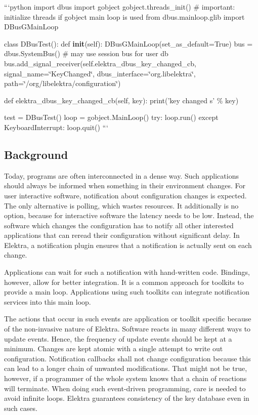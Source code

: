```python import dbus import gobject gobject.\+threads\+\_\+init() \# important\+: initialize threads if gobject main loop is used from dbus.\+mainloop.\+glib import D\+Bus\+G\+Main\+Loop

class D\+Bus\+Test()\+: def {\bfseries init}(self)\+: D\+Bus\+G\+Main\+Loop(set\+\_\+as\+\_\+default=True) bus = dbus.\+System\+Bus() \# may use session bus for user db bus.\+add\+\_\+signal\+\_\+receiver(self.\+elektra\+\_\+dbus\+\_\+key\+\_\+changed\+\_\+cb, signal\+\_\+name=\char`\"{}\+Key\+Changed\char`\"{}, dbus\+\_\+interface=\char`\"{}org.\+libelektra\char`\"{}, path=\char`\"{}/org/libelektra/configuration\char`\"{})

def elektra\+\_\+dbus\+\_\+key\+\_\+changed\+\_\+cb(self, key)\+: print('key changed s' \% key)

test = D\+Bus\+Test() loop = gobject.\+Main\+Loop() try\+: loop.\+run() except Keyboard\+Interrupt\+: loop.\+quit() ```

\subsection*{Background}

Today, programs are often interconnected in a dense way. Such applications should always be informed when something in their environment changes. For user interactive software, notification about configuration changes is expected. The only alternative is polling, which wastes resources. It additionally is no option, because for interactive software the latency needs to be low. Instead, the software which changes the configuration has to notify all other interested applications that can reread their configuration without significant delay. In Elektra, a notification plugin ensures that a notification is actually sent on each change.

Applications can wait for such a notification with hand-\/written code. Bindings, however, allow for better integration. It is a common approach for toolkits to provide a main loop. Applications using such toolkits can integrate notification services into this main loop.

The actions that occur in such events are application or toolkit specific because of the non-\/invasive nature of Elektra. Software reacts in many different ways to update events. Hence, the frequency of update events should be kept at a minimum. Changes are kept atomic with a single attempt to write out configuration. Notification callbacks shall not change configuration because this can lead to a longer chain of unwanted modifications. That might not be true, however, if a programmer of the whole system knows that a chain of reactions will terminate. When doing such event-\/driven programming, care is needed to avoid infinite loops. Elektra guarantees consistency of the key database even in such cases. 